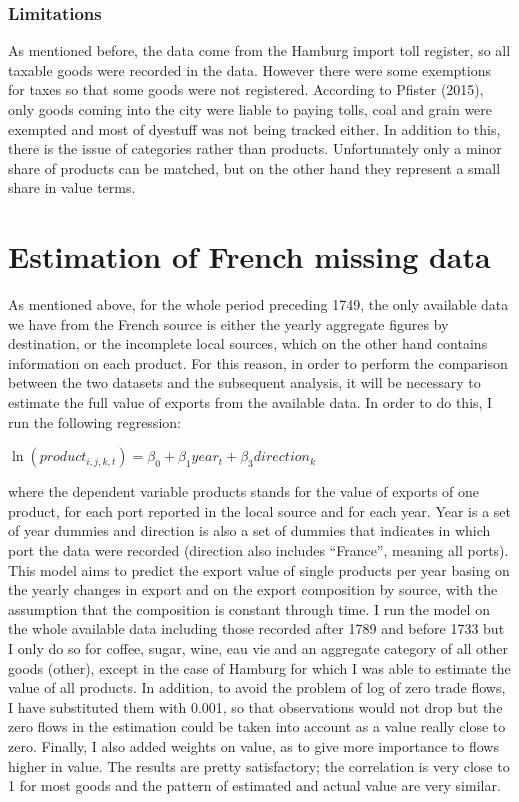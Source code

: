 \documentclass[12pt,a4paper,titlepage]{article}
\begin{document}
\subsubsection{Limitations}
As mentioned before, the data come from the Hamburg import toll register, so all taxable goods were recorded in the data. However there were some exemptions for taxes so that some goods were not registered. According to Pfister (2015), only goods coming into the city were liable to paying tolls, coal and grain were exempted and most of dyestuff was not being tracked either. In addition to this, there is the issue of categories rather than products. Unfortunately only a minor share of products can be matched, but on the other hand they represent a small share in value terms. 

\section{Estimation of French missing data}
As mentioned above, for the whole period preceding 1749, the only available data we have from the French source is either the yearly aggregate figures by destination, or the incomplete local sources, which on the other hand contains information on each product. For this reason, in order to perform the comparison between the two datasets and the subsequent analysis, it will be necessary to estimate the full value of exports from the available data. In order to do this, I run the following regression:
\begin{center}
$\ln(product_{i,j,k,t})=\beta_0 + \beta_1year_t+\beta_3direction_k$
\end{center}
where the dependent variable products stands for the value of exports of one product, for each port reported in the local source and for each year. Year is a set of year dummies and direction is also a set of dummies that indicates in which port the data were recorded (direction also includes “France”, meaning all ports). This model aims to predict the export value of single products per year basing on the yearly changes in export and on the export composition by source, with the assumption that the composition is constant through time. I run the model on the whole available data including those recorded after 1789 and before 1733 but I only do so for coffee, sugar, wine, eau vie and an aggregate category of all other goods (other), except in the case of Hamburg for which I was able to estimate the value of all products. In addition, to avoid the problem of log of zero trade flows, I have substituted them with 0.001, so that observations would not drop but the zero flows in the estimation could be taken into account as a value really close to zero. Finally, I also added weights on value, as to give more importance to flows higher in value. The results are pretty satisfactory; the correlation is very close to 1 for most goods and the pattern of estimated and actual value are very similar. 
\end{document}
